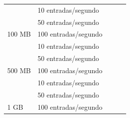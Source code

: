 \begin{table}[H]
\begin{tabular}{|l|l|l|l|l|}
                                                         & 10 entradas/segundo                               &                                        &                                        &                                                 \\ \cline{2-5} 
                                                         & 50 entradas/segundo                               &                                        &                                        &                                                 \\ \cline{2-5} 
\multirow{-3}{*}{100 MB}                                 & 100 entradas/segundo                              &                                        &                                        &                                                 \\ \hline
                                                         & 10 entradas/segundo                               &                                        &                                        &                                                 \\ \cline{2-5} 
                                                         & 50 entradas/segundo                               &                                        &                                        &                                                 \\ \cline{2-5} 
\multirow{-3}{*}{500 MB}                                 & 100 entradas/segundo                              &                                        &                                        &                                                 \\ \hline
                                                         & 10 entradas/segundo                               &                                        &                                        &                                                 \\ \cline{2-5} 
                                                         & 50 entradas/segundo                               &                                        &                                        &                                                 \\ \cline{2-5} 
\multirow{-3}{*}{1 GB}                                   & 100 entradas/segundo                              &                                        &                                        &                                                 \\ \hline
\end{tabular}
\end{table}


